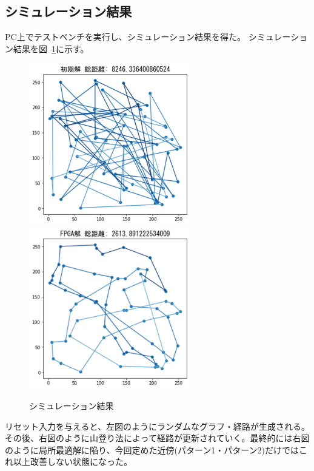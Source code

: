 \subsection{シミュレーション結果}
PC上でテストベンチを実行し、シミュレーション結果を得た。
シミュレーション結果を図~\ref{fig:sim}に示す。
\begin{figure}[h]
    \begin{center}
        \includegraphics[width=7cm]{figure/fpga_tsp_bad.png}
        \includegraphics[width=7cm]{figure/fpga_tsp_good.png}
        \caption{シミュレーション結果}\label{fig:sim}
    \end{center}
\end{figure}
リセット入力を与えると、左図のようにランダムなグラフ・経路が生成される。
その後、右図のように山登り法によって経路が更新されていく。最終的には右図のように局所最適解に陥り、今回定めた近傍(パターン1・パターン2)だけではこれ以上改善しない状態になった。

